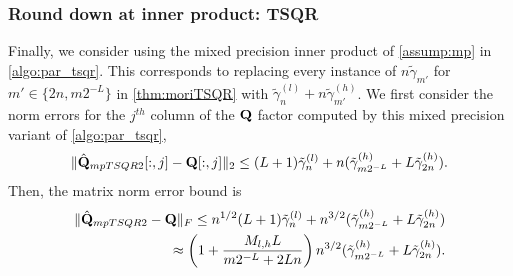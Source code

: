 \subsubsection{Round down at inner product: TSQR}
Finally, we consider using the mixed precision inner product of \cref{assump:mp} in \cref{algo:par_tsqr}.
This corresponds to replacing every instance of $n\tilde{\gamma}_{m'}$ for $m'\in\{2n, m2^{-L}\}$ in \cref{thm:moriTSQR} with $\tilde{\gamma}_n^{(l)} + n\tilde{\gamma}_{m'}^{(h)}$.
We first consider the norm errors for the $j^{th}$ column of the $\mathbf{Q}$ factor computed by this mixed precision variant of \cref{algo:par_tsqr},
\begin{equation}
	\|\hat{\bb{Q}}_{mpTSQR2}[:,j] -\bb{Q}[:,j]\|_2 \leq (L+1)\tilde{\gamma}_n^{(l)} +n(\tilde{\gamma}_{m2^{-L}}^{(h)} + L\tilde{\gamma}_{ 2n}^{(h)}).\label{eqn:mptsqr2Qcol}
\end{equation} 
Then, the matrix norm error bound is 
\begin{align}
\|\hat{\bb{Q}}_{mpTSQR2}-\bb{Q}\|_F \leq n^{1/2}(L+1)\tilde{\gamma}_n^{(l)} +n^{3/2}(\tilde{\gamma}_{m2^{-L}}^{(h)} + L\tilde{\gamma}_{ 2n}^{(h)})\\
\approx \left(1+ \frac{M_{l,h}L}{m2^{-L}+ 2Ln}\right)n^{3/2}(\tilde{\gamma}_{m2^{-L}}^{(h)} + L\tilde{\gamma}_{ 2n}^{(h)}).\label{eqn:mptsqr2Q}
\end{align} 
